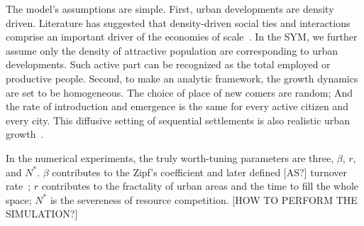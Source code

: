 \documentclass[reprint,unsortedaddress,amsmath,amssymb,aps,prl,showkeys]{revtex4-2}
\begin{document}
The model's assumptions are simple. First, urban developments are density driven. Literature has suggested that density-driven social ties and interactions comprise an important driver of the economies of scale~\cite{pan2013urban, girardin2009quantifying, batty1992form}. In the SYM, we further assume only the density of attractive population are corresponding to urban developments. Such active part can be recognized as the total employed or productive people. Second, to make an analytic framework, the growth dynamics are set to be homogeneous. The choice of place of new comers are random; And the rate of introduction and emergence is the same for every active citizen and every city. This diffusive setting of sequential settlements is also realistic urban growth~\cite{RevModPhys.87.925}. 

In the numerical experiments, the truly worth-tuning parameters are three, $\beta$, $r$, and $N^*$. $\beta$ contributes to the Zipf's coefficient and later defined [AS?] turnover rate~\cite{rooney2006structural}; $r$ contributes to the fractality of urban areas and the time to fill the whole space; $N^*$ is the severeness of resource competition. [HOW TO PERFORM THE SIMULATION?]
\end{document}
